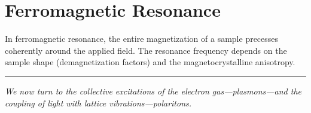 \section{Ferromagnetic Resonance}

In ferromagnetic resonance, the entire magnetization of a sample precesses coherently around the applied field. The resonance frequency depends on the sample shape (demagnetization factors) and the magnetocrystalline anisotropy.

\vspace{1cm}
\noindent\rule{\textwidth}{0.4pt}
\textit{We now turn to the collective excitations of the electron gas---plasmons---and the coupling of light with lattice vibrations---polaritons.}
